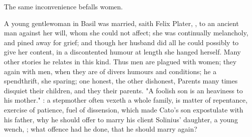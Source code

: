 The same inconvenience befalls women.


A young gentlewoman in Basil was married, saith Felix
Plater, , to an ancient man against her
will, whom she could not affect; she was continually melancholy, and pined away
for grief; and though her husband did all he could possibly to give her
content, in a discontented humour at length she hanged herself. Many other
stories he relates in this kind. Thus men are plagued with women; they again
with men, when they are of divers humours and conditions; he a spendthrift, she
sparing; one honest, the other dishonest, \etc{} Parents many times disquiet
their children, and they their parents. "A foolish son is
an heaviness to his mother." : a stepmother often vexeth a
whole family, is matter of repentance, exercise of patience, fuel of
dissension, which made Cato's son expostulate with his father, why he should
offer to marry his client Solinius' daughter, a young wench, ; what offence had he done, that he should marry again?

